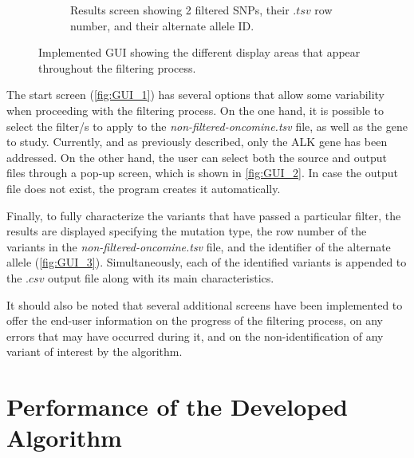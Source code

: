 \begin{figure}[ht]
\begin{subfigure}{0.52\textwidth}
        \caption{Results screen showing 2 filtered SNPs, their $.tsv$ row number, and their alternate allele ID.}
        \label{fig:GUI_3}
    \end{subfigure}
    \hfill
    \caption{Implemented GUI showing the different display areas that appear throughout the filtering process.}
    \label{fig:GUI}
\end{figure}

The start screen (\autoref{fig:GUI_1}) has several options that allow some variability when proceeding with the filtering process. On the one hand, it is possible to select the filter\slash s to apply to the \textit{non-filtered-oncomine.tsv} file, as well as the gene to study. Currently, and as previously described, only the ALK gene has been addressed. On the other hand, the user can select both the source and output files through a pop-up screen, which is shown in \autoref{fig:GUI_2}. In case the output file does not exist, the program creates it automatically.

Finally, to fully characterize the variants that have passed a particular filter, the results are displayed specifying the mutation type, the row number of the variants in the \textit{non-filtered-oncomine.tsv} file, and the identifier of the alternate allele (\autoref{fig:GUI_3}). Simultaneously, each of the identified variants is appended to the $.csv$ output file along with its main characteristics.

It should also be noted that several additional screens have been implemented to offer the end-user information on the progress of the filtering process, on any errors that may have occurred during it, and on the non-identification of any variant of interest by the algorithm.

\section{Performance of the Developed Algorithm}



